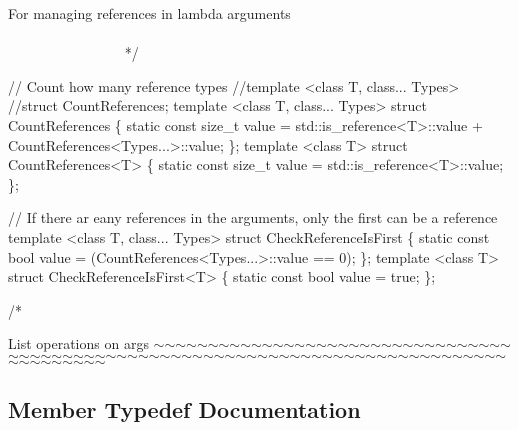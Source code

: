 \begin{DoxyCode}
    For managing references in lambda arguments 
   ~~~~~~~~~~~~~~~~~~~~~~~~~~~~~~~~~~~~~~~~~~~~~~~~~~~~~~~~~~~~~~~~~~~~~~~~~~~~~~~~~~~~~~~~ */


\textcolor{comment}{// Count how many reference types}
\textcolor{comment}{//template <class T, class... Types>}
\textcolor{comment}{//struct CountReferences;}
\textcolor{keyword}{template} <\textcolor{keyword}{class }T, \textcolor{keyword}{class}... Types>
\textcolor{keyword}{struct }CountReferences \{
    \textcolor{keyword}{static} \textcolor{keyword}{const} \textcolor{keywordtype}{size\_t} value = std::is\_reference<T>::value + CountReferences<Types...>::value;
\};
\textcolor{keyword}{template} <\textcolor{keyword}{class} T>
\textcolor{keyword}{struct }CountReferences<T> \{ \textcolor{keyword}{static} \textcolor{keyword}{const} \textcolor{keywordtype}{size\_t} value = std::is\_reference<T>::value; \};


\textcolor{comment}{// If there ar eany references in the arguments, only the first can be a reference}
\textcolor{keyword}{template} <\textcolor{keyword}{class }T, \textcolor{keyword}{class}... Types>
\textcolor{keyword}{struct }CheckReferenceIsFirst \{
    \textcolor{keyword}{static} \textcolor{keyword}{const} \textcolor{keywordtype}{bool} value = (CountReferences<Types...>::value == 0);
\};
\textcolor{keyword}{template} <\textcolor{keyword}{class} T>
\textcolor{keyword}{struct }CheckReferenceIsFirst<T> \{ \textcolor{keyword}{static} \textcolor{keyword}{const} \textcolor{keywordtype}{bool} value = \textcolor{keyword}{true}; \};


\textcolor{comment}{/*}
\end{DoxyCode}
 List operations on args $\sim$$\sim$$\sim$$\sim$$\sim$$\sim$$\sim$$\sim$$\sim$$\sim$$\sim$$\sim$$\sim$$\sim$$\sim$$\sim$$\sim$$\sim$$\sim$$\sim$$\sim$$\sim$$\sim$$\sim$$\sim$$\sim$$\sim$$\sim$$\sim$$\sim$$\sim$$\sim$$\sim$$\sim$$\sim$$\sim$$\sim$$\sim$$\sim$$\sim$$\sim$$\sim$$\sim$$\sim$$\sim$$\sim$$\sim$$\sim$$\sim$$\sim$$\sim$$\sim$$\sim$$\sim$$\sim$$\sim$$\sim$$\sim$$\sim$$\sim$$\sim$$\sim$$\sim$$\sim$$\sim$$\sim$$\sim$$\sim$$\sim$$\sim$$\sim$$\sim$$\sim$$\sim$$\sim$$\sim$$\sim$$\sim$$\sim$$\sim$$\sim$$\sim$$\sim$$\sim$$\sim$$\sim$$\sim$$\sim$ 

\subsection{Member Typedef Documentation}
\mbox{\label{struct_type_head_a9595415877619fea585771991836e9a2}} 
